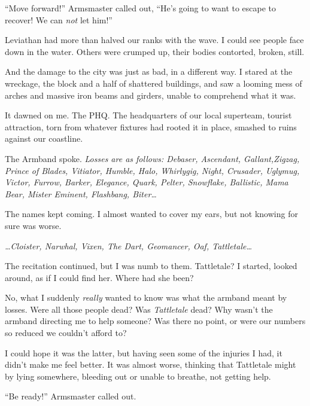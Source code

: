 ``Move forward!'' Armsmaster called out, ``He's going to want to escape to recover!  We can \emph{not }let him!''



Leviathan had more than halved our ranks with the wave.  I could see people face down in the water.  Others were crumped up, their bodies contorted, broken, still.



And the damage to the city was just as bad, in a different way.  I stared at the wreckage, the block and a half of shattered buildings, and saw a looming mess of arches and massive iron beams and girders, unable to comprehend what it was.



It dawned on me.  The PHQ.  The headquarters of our local superteam, tourist attraction, torn from whatever fixtures had rooted it in place, smashed to ruins against our coastline.



The Armband spoke. \emph{Losses are as follows: Debaser, Ascendant, Gallant,Zigzag, Prince of Blades, Vitiator, Humble, Halo, Whirlygig, Night, Crusader, Uglymug, Victor, Furrow, Barker, Elegance, Quark, Pelter, Snowflake, Ballistic, Mama Bear, Mister Eminent, Flashbang, Biter\ldots}



The names kept coming.  I almost wanted to cover my ears, but not knowing for sure was worse.



\emph{\ldots{}Cloister, Narwhal, Vixen, The Dart, Geomancer, Oaf, Tattletale\ldots}


The recitation continued, but I was numb to them.  Tattletale?  I started, looked around, as if I could find her.  Where had she been?



No, what I suddenly \emph{really} wanted to know was what the armband meant by losses.  Were all those people dead?  Was \emph{Tattletale} dead?  Why wasn't the armband directing me to help someone?  Was there no point, or were our numbers so reduced we couldn't afford to?



I could hope it was the latter, but having seen some of the injuries I had, it didn't make me feel better.  It was almost worse, thinking that Tattletale might by lying somewhere, bleeding out or unable to breathe, not getting help.



``Be ready!'' Armsmaster called out.



